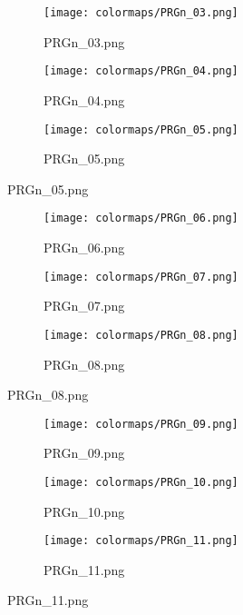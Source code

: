 \documentclass{article}%
\begin{document}
\begin{figure}[h!]%
\begin{subfigure}[b]{0.3\linewidth}%
\texttt{[image: colormaps/PRGn\_03.png]}%
\caption{PRGn\_03.png}%
\end{subfigure}%
\begin{subfigure}[b]{0.3\linewidth}%
\texttt{[image: colormaps/PRGn\_04.png]}%
\caption{PRGn\_04.png}%
\end{subfigure}%
\begin{subfigure}[b]{0.3\linewidth}%
\texttt{[image: colormaps/PRGn\_05.png]}%
\caption{PRGn\_05.png}%
\end{subfigure}%
\end{figure}

%
\hspace{1cm}\hfill%
\hspace{1cm}\hfill%
\hspace{1cm}\hfill%


\begin{figure}[h!]%
\begin{subfigure}[b]{0.3\linewidth}%
\texttt{[image: colormaps/PRGn\_06.png]}%
\caption{PRGn\_06.png}%
\end{subfigure}%
\begin{subfigure}[b]{0.3\linewidth}%
\texttt{[image: colormaps/PRGn\_07.png]}%
\caption{PRGn\_07.png}%
\end{subfigure}%
\begin{subfigure}[b]{0.3\linewidth}%
\texttt{[image: colormaps/PRGn\_08.png]}%
\caption{PRGn\_08.png}%
\end{subfigure}%
\end{figure}

%
\hspace{1cm}\hfill%
\hspace{1cm}\hfill%
\hspace{1cm}\hfill%


\begin{figure}[h!]%
\begin{subfigure}[b]{0.3\linewidth}%
\texttt{[image: colormaps/PRGn\_09.png]}%
\caption{PRGn\_09.png}%
\end{subfigure}%
\begin{subfigure}[b]{0.3\linewidth}%
\texttt{[image: colormaps/PRGn\_10.png]}%
\caption{PRGn\_10.png}%
\end{subfigure}%
\begin{subfigure}[b]{0.3\linewidth}%
\texttt{[image: colormaps/PRGn\_11.png]}%
\caption{PRGn\_11.png}%
\end{subfigure}%
\end{figure}
\end{document}

